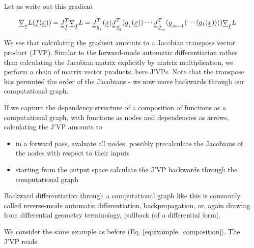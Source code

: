 Let us write out this gradient

\begin{equation}
    \vec{\nabla}_\vec{x}L(\vec{f}(\vec{x})) = \mat{J}_\vec{f}^T \vec{\nabla}_\vec{f} L =  \mat{J}_{\vec{g}_1}^T(\vec{x}) \mat{J}_{\vec{g}_2}^T(\vec{g}_1(\vec{x})) \cdots \mat{J}_{\vec{g}_m}^T(\vec{g}_{m-1}(\cdots(g_1(\vec{x})))) \vec{\nabla}_\vec{f} L
\end{equation}

We see that calculating the gradient amounts to a Jacobian transpose vector product (J'VP). Similar
to the forward-mode automatic differentiation rather than calculating the Jacobian matrix explicitly by matrix
multiplication, we perform a chain of matrix vector products, here J'VPs. Note that the 
transpose has permuted the order of the Jacobians - we now move backwards through our computational graph.



If we capture the dependency structure of a composition of functions as a computational graph,
with functions as nodes and dependencies as arrows, calculating the J'VP amounts to
\begin{itemize}
    \item in a forward pass, evaluate all nodes, possibly precalculate the Jacobians of the nodes with respect to their inputs
    \item starting from the output space calculate the J'VP backwards through the computational graph
\end{itemize}

Backward differentiation through a computational graph like this is commonly called reverse-mode
automatic differentiation, backpropagation, or, again drawing from differential geometry terminology,
pullback (of a differential form).


We consider the same example as before (Eq. \ref{eq:example_composition}). The J'VP reads

